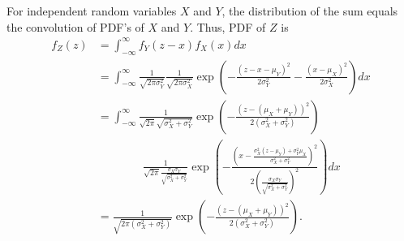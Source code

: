 \documentclass{article}
\begin{document}
\begin{enumerate}
For independent random variables $X$ and $Y$, the distribution of the sum equals the convolution of PDF's of $X$ and $Y$.
Thus, PDF of $Z$ is
	\begin{align*}
	f_Z(z)&=\int_{-\infty}^\infty f_Y(z-x)f_X(x)dx\\
	&=	\int_{-\infty}^\infty \frac{1}{\sqrt{2\pi \sigma_Y^2}} \frac{1}{\sqrt{2\pi\sigma_X^2}} \exp\left(-\frac{(z-x-\mu_Y)^2}{2\sigma_Y^2}-\frac{(x-\mu_X)^2}{2\sigma_X^2}\right) dx\\
	&=\int_{-\infty}^\infty \frac{1}{\sqrt{2\pi}\sqrt{\sigma_X^2+\sigma_Y^2}} \exp\left(-\frac{(z-(\mu_X+\mu_Y))^2}{2(\sigma_X^2+\sigma_Y^2)}\right)
	\\
	&\quad\quad\quad\quad\frac{1}{\sqrt{2\pi}\frac{\sigma_X\sigma_Y}{\sqrt{\sigma_X^2+\sigma_Y^2}}}\exp\left(-\frac{\left(x-\frac{\sigma_X^2(z-\mu_Y)+\sigma_Y^2\mu_X}{\sigma_X^2+\sigma_Y^2}\right)^2}{2\left(\frac{\sigma_X\sigma_Y}{\sqrt{\sigma_X^2+\sigma_Y^2}}\right)^2}\right)dx\\
	&=\frac{1}{\sqrt{2\pi(\sigma_X^2+\sigma_Y^2)}}\exp\left(-\frac{(z-(\mu_X+\mu_Y))^2}{2(\sigma_X^2+\sigma_Y^2)}\right).
	\end{align*}



\end{enumerate}
\end{document}
